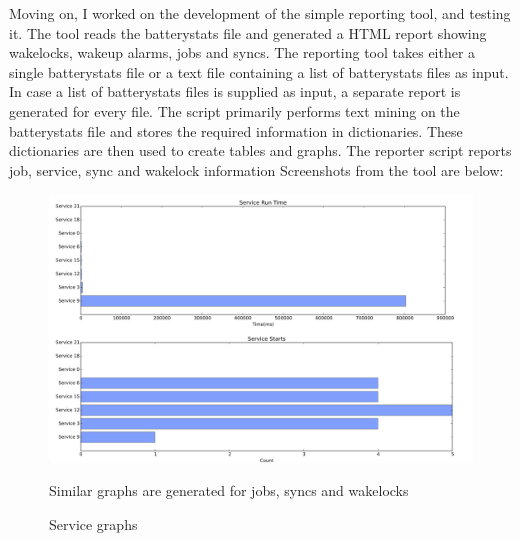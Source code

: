 Moving on, I worked on the development of the simple reporting tool, and testing it. The tool reads the batterystats file and generated a HTML report showing wakelocks, wakeup alarms, jobs and syncs. The reporting tool takes either a single batterystats file or a text file containing a list of batterystats files as input. In case a list of batterystats files is supplied as input, a separate report is generated for every file. The script primarily performs text mining on the batterystats file and stores the required information in dictionaries. These dictionaries are then used to create tables and graphs. The reporter script reports job, service, sync and wakelock information Screenshots from the tool are below:
\begin{figure}[!h]
 	\begin{center}
		\includegraphics[scale=0.35]{reporter2}
		\caption{Service graphs}
		Similar graphs are generated for jobs, syncs and wakelocks
	\end{center}
\end{figure}
